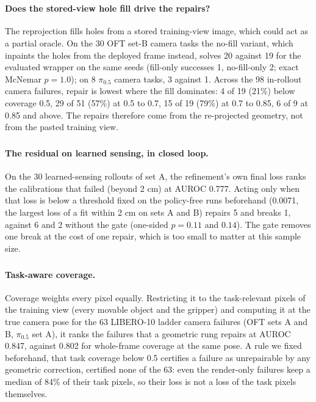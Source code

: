 \documentclass{article}
\newcommand{\pihalf}{$\pi_{0.5}$}
\newcommand{\ph}{\textsuperscript{\dag}}
\begin{document}
\paragraph{Does the stored-view hole fill drive the repairs?\ph} The reprojection fills holes
from a stored training-view image, which could act as a partial oracle. On the 30 OFT set-B camera tasks the no-fill variant, which inpaints the holes from the deployed frame instead, solves 20 against 19 for the evaluated wrapper on the same seeds (fill-only successes 1, no-fill-only 2; exact McNemar $p = 1.0$); on 8 \pihalf{} camera
tasks, 3 against 1. Across the 98 in-rollout camera failures, repair is lowest where the fill dominates: 4 of 19 (21\%)
below coverage 0.5, 29 of 51 (57\%) at 0.5 to 0.7, 15 of 19 (79\%) at 0.7 to 0.85, 6 of 9 at 0.85 and above. The
repairs therefore come from the re-projected geometry, not from the pasted training view.

\paragraph{The residual on learned sensing, in closed loop\ph.} On the 30 learned-sensing
rollouts of set A, the refinement's own final loss ranks the calibrations that failed (beyond 2 cm) at AUROC 0.777.
Acting only when that loss is below a threshold fixed on the policy-free runs beforehand (0.0071, the largest loss of a
fit within 2 cm on sets A and B) repairs 5 and breaks 1, against 6 and 2 without the gate (one-sided $p = 0.11$ and
$0.14$). The gate removes one break at the cost of one repair, which is too small to matter at this sample size.

\paragraph{Task-aware coverage\ph.} Coverage weights
every pixel equally. Restricting it to the task-relevant pixels of the training view (every movable object and the
gripper) and computing it at the true camera pose for the 63 LIBERO-10 ladder camera failures (OFT sets A and B,
\pihalf{} set A), it ranks the failures that a geometric rung repairs at AUROC 0.847, against 0.802 for whole-frame
coverage at the same pose. A rule we fixed beforehand, that task coverage below 0.5 certifies a failure as
unrepairable by any geometric correction, certified none of the 63: even the render-only failures keep a median of 84\%
of their task pixels, so their loss is not a loss of the task pixels themselves.
\end{document}
